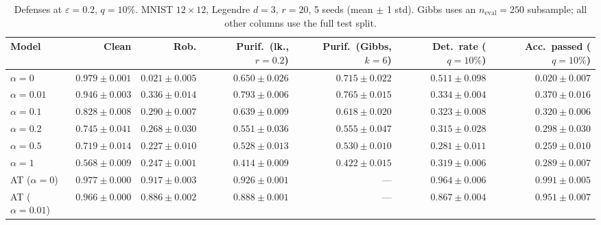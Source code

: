 \begin{table}[htbp]
  \centering
  \small
  \begin{tabular}{@{}lrrrrrr@{}}
    \toprule
    Model & Clean & Rob. & Purif.\ (lk., $r{=}0.2$) & Purif.\ (Gibbs, $k{=}6$) & Det.\ rate ($q{=}10\%$) & Acc.\ passed ($q{=}10\%$) \\
    \midrule
    $\alpha{=}0$ & $\mathbf{0.979 \pm 0.001}$ & $0.021 \pm 0.005$ & $0.650 \pm 0.026$ & $0.715 \pm 0.022$ & $0.511 \pm 0.098$ & $0.020 \pm 0.007$ \\
    $\alpha{=}0.01$ & $0.946 \pm 0.003$ & $0.336 \pm 0.014$ & $0.793 \pm 0.006$ & $\mathbf{0.765 \pm 0.015}$ & $0.334 \pm 0.004$ & $0.370 \pm 0.016$ \\
    $\alpha{=}0.1$ & $0.828 \pm 0.008$ & $0.290 \pm 0.007$ & $0.639 \pm 0.009$ & $0.618 \pm 0.020$ & $0.323 \pm 0.008$ & $0.320 \pm 0.006$ \\
    $\alpha{=}0.2$ & $0.745 \pm 0.041$ & $0.268 \pm 0.030$ & $0.551 \pm 0.036$ & $0.555 \pm 0.047$ & $0.315 \pm 0.028$ & $0.298 \pm 0.030$ \\
    $\alpha{=}0.5$ & $0.719 \pm 0.014$ & $0.227 \pm 0.010$ & $0.528 \pm 0.013$ & $0.530 \pm 0.010$ & $0.281 \pm 0.011$ & $0.259 \pm 0.010$ \\
    $\alpha{=}1$ & $0.568 \pm 0.009$ & $0.247 \pm 0.001$ & $0.414 \pm 0.009$ & $0.422 \pm 0.015$ & $0.319 \pm 0.006$ & $0.289 \pm 0.007$ \\
    AT ($\alpha{=}0$) & $0.977 \pm 0.000$ & $\mathbf{0.917 \pm 0.003}$ & $\mathbf{0.926 \pm 0.001}$ & --- & $\mathbf{0.964 \pm 0.006}$ & $\mathbf{0.991 \pm 0.005}$ \\
    AT ($\alpha{=}0.01$) & $0.966 \pm 0.000$ & $0.886 \pm 0.002$ & $0.888 \pm 0.001$ & --- & $0.867 \pm 0.004$ & $0.951 \pm 0.007$ \\
    \bottomrule
  \end{tabular}
  \caption{Defenses at $\varepsilon=0.2$, $q{=}10\%$. MNIST $12\times12$, Legendre $d{=}3$, $r{=}20$, 5 seeds (mean $\pm$ 1 std). Gibbs uses an $n_{\mathrm{eval}}=250$ subsample; all other columns use the full test split.}
  \label{tab:mnist_r12_models_r20_eps0.2}
\end{table}
